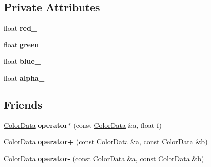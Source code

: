 \subsection*{Private Attributes}
\begin{DoxyCompactItemize}
\item 
float {\bfseries red\+\_\+}\hypertarget{classimage__tools_1_1ColorData_a78160b930d95c4ece6913717de69d228}{}\label{classimage__tools_1_1ColorData_a78160b930d95c4ece6913717de69d228}

\item 
float {\bfseries green\+\_\+}\hypertarget{classimage__tools_1_1ColorData_aabfb09bb331483211b5b023a6870ea86}{}\label{classimage__tools_1_1ColorData_aabfb09bb331483211b5b023a6870ea86}

\item 
float {\bfseries blue\+\_\+}\hypertarget{classimage__tools_1_1ColorData_a8d44e8cd0701a5cd6fbee7fdb4d01309}{}\label{classimage__tools_1_1ColorData_a8d44e8cd0701a5cd6fbee7fdb4d01309}

\item 
float {\bfseries alpha\+\_\+}\hypertarget{classimage__tools_1_1ColorData_a7bc7d145ee17270baa2d17a03fa17c1e}{}\label{classimage__tools_1_1ColorData_a7bc7d145ee17270baa2d17a03fa17c1e}

\end{DoxyCompactItemize}
\subsection*{Friends}
\begin{DoxyCompactItemize}
\item 
\hyperlink{classimage__tools_1_1ColorData}{Color\+Data} {\bfseries operator$\ast$} (const \hyperlink{classimage__tools_1_1ColorData}{Color\+Data} \&a, float f)\hypertarget{classimage__tools_1_1ColorData_adf9a770243996e50282d248a4327f351}{}\label{classimage__tools_1_1ColorData_adf9a770243996e50282d248a4327f351}

\item 
\hyperlink{classimage__tools_1_1ColorData}{Color\+Data} {\bfseries operator+} (const \hyperlink{classimage__tools_1_1ColorData}{Color\+Data} \&a, const \hyperlink{classimage__tools_1_1ColorData}{Color\+Data} \&b)\hypertarget{classimage__tools_1_1ColorData_afee00faf26189979b72f3854a17200ae}{}\label{classimage__tools_1_1ColorData_afee00faf26189979b72f3854a17200ae}

\item 
\hyperlink{classimage__tools_1_1ColorData}{Color\+Data} {\bfseries operator-\/} (const \hyperlink{classimage__tools_1_1ColorData}{Color\+Data} \&a, const \hyperlink{classimage__tools_1_1ColorData}{Color\+Data} \&b)\hypertarget{classimage__tools_1_1ColorData_a799bd54f65a61569b5b968062ac0d37e}{}\label{classimage__tools_1_1ColorData_a799bd54f65a61569b5b968062ac0d37e}

\end{DoxyCompactItemize}


